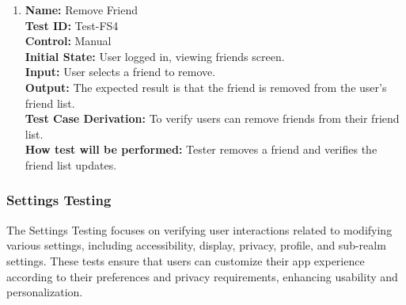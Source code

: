 \documentclass[12pt, titlepage]{article}
\begin{document}
\begin{enumerate}
    \item \textbf{Name:} {Remove Friend} \label{itm:Test-FS4}\\
    \textbf{Test ID:} Test-FS4\\
    \textbf{Control:} Manual \\
    \textbf{Initial State:} User logged in, viewing friends screen. \\
    \textbf{Input:} User selects a friend to remove. \\
    \textbf{Output:} The expected result is that the friend is removed from the user’s friend list. \\
    \textbf{Test Case Derivation:} To verify users can remove friends from their friend list. \\
    \textbf{How test will be performed:} Tester removes a friend and verifies the friend list updates.

\end{enumerate}

\subsubsection{Settings Testing}
\label{sec:settings_testing}

The Settings Testing focuses on verifying user interactions related to modifying various settings, including accessibility, display, privacy, profile, and sub-realm settings. These tests ensure that users can customize their app experience according to their preferences and privacy requirements, enhancing usability and personalization.
\end{document}
